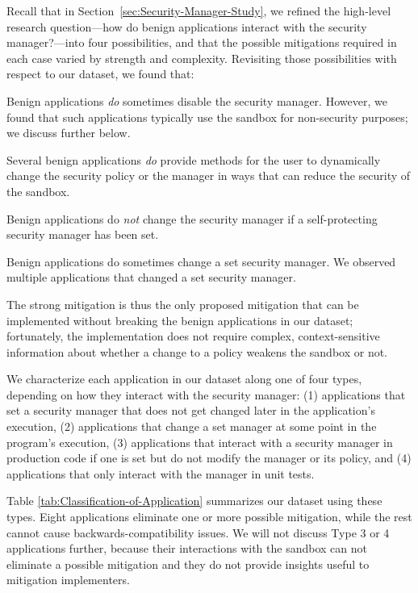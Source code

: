 \documentclass{sig-alternate}
\begin{document}
Recall that in Section~\ref{sec:Security-Manager-Study}, we refined the
high-level research question---how do benign applications interact with the
security manager?---into four possibilities, and that the possible mitigations
required in each case varied by strength and complexity.  Revisiting those
possibilities with respect to our dataset, we found that:
\begin{flushenum}\setlength{\parskip}{0pt}
  \setlength{\parsep}{0pt}
  \setlength{\itemsep}{0pt}
\item Benign applications \emph{do} sometimes disable the security manager.
  However, we found that such applications typically use the sandbox for
  non-security purposes; we discuss further below.

\item Several benign applications \emph{do} provide methods for the user to
  dynamically change the security policy or the manager in ways that can reduce
  the security of the sandbox.

\item Benign applications do \emph{not} change the
security manager if a self-protecting security manager has been set.  

\item Benign applications do sometimes change a set security manager.  We
  observed multiple applications that changed a set security manager.
\end{flushenum}

The strong mitigation is thus the only proposed mitigation that can be
implemented without breaking the benign applications in our dataset;
fortunately, the implementation does not require complex, context-sensitive
information about whether a change to a policy weakens the sandbox or not. 

We characterize each application in our dataset along one of four types, depending on how they
interact with the security manager:
(1) applications that set a
security manager that does not get changed later in the application's
execution, (2) applications that change a set manager at some point
in the program's execution, (3) applications that interact with a
security manager in production code if one is set but do not modify the manager
or its policy, and (4) applications
that only interact with the manager in unit tests. 

Table \ref{tab:Classification-of-Application}
summarizes our dataset using these types. Eight applications eliminate one or more possible mitigation, while the rest cannot cause backwards-compatibility issues. We will
not discuss Type 3 or 4 applications further, because their interactions with
the sandbox can not eliminate a possible mitigation and they do not provide insights useful to mitigation implementers.  
\end{document}
